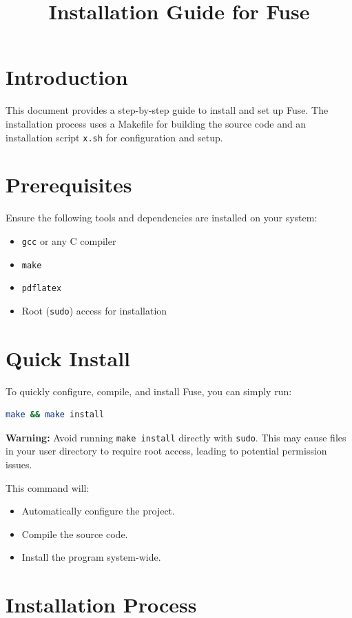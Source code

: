 \documentclass[a4paper,12pt]{article}
\title{\textbf{Installation Guide for Fuse}}
\author{}
\date{}
\begin{document}
\maketitle

\section{Introduction}
This document provides a step-by-step guide to install and set up Fuse. The installation process uses a Makefile for building the source code and an installation script \texttt{x.sh} for configuration and setup.

\section{Prerequisites}
Ensure the following tools and dependencies are installed on your system:
\begin{itemize}
	\item \texttt{gcc} or any C compiler
	\item \texttt{make}
	\item \texttt{pdflatex}
	\item Root (\texttt{sudo}) access for installation
\end{itemize}

\section{Quick Install}
To quickly configure, compile, and install Fuse, you can simply run:
\begin{lstlisting}[language=bash]
make && make install
\end{lstlisting}
\textbf{Warning:} Avoid running \texttt{make install} directly with \texttt{sudo}. This may cause files in your user directory to require root access, leading to potential permission issues.

This command will:
\begin{itemize}
	\item Automatically configure the project.
	\item Compile the source code.
	\item Install the program system-wide.
\end{itemize}

\section{Installation Process}
\end{document}
